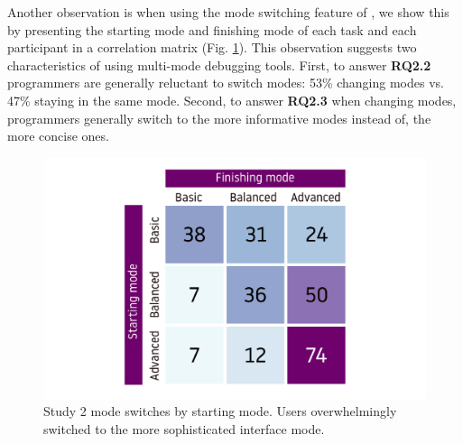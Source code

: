 

Another observation is when using the mode switching feature of \chameleon{}, we show this by presenting the starting mode and finishing mode of each task and each participant in a correlation matrix (Fig. \ref{fig:r4-mode-switching}). This observation suggests two characteristics of using multi-mode debugging tools. First, to answer \textbf{RQ2.2} programmers are generally reluctant to switch modes: 53\% changing modes vs. 47\% staying in the same mode. Second, to answer \textbf{RQ2.3} when changing modes, programmers generally switch to the more informative modes instead of, the more concise ones.
\begin{figure}
    \centering
    \includegraphics[width=0.7\linewidth,trim=0mm 5mm 0mm 5mm,clip]{images/mode-switching.pdf}
    \caption{Study 2 mode switches by starting mode.  Users overwhelmingly switched to the more sophisticated interface mode.
    }
    \label{fig:r4-mode-switching}
\end{figure}


